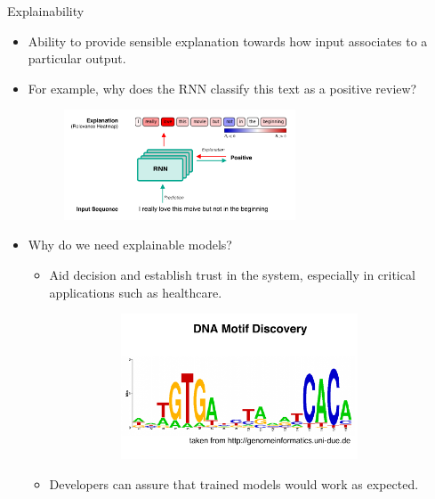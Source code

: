 \documentclass[Nike]{tuberlinbeamer}
\begin{document}
\begin{frame}[allowframebreaks=0.8,t]{Explainability}
\begin{itemize}
	\item Ability to provide sensible explanation towards how input associates to a particular output.
	\item For example, why does the RNN classify this text as a positive review?

	\begin{figure}[h]
		\includegraphics [width=0.65\textwidth]{figures/present_explanation_rnn}
	\end{figure}
	
	\item Why do we need explainable models?\begin{itemize}
		\item Aid decision and establish trust in the system, especially in critical applications such as healthcare.
	\begin{figure}[h]
		\centering
%
		\begin{subfigure}[b]{0.5\linewidth}
		  \centering

			\includegraphics [width=0.9\textwidth]{figures/present_motif_discovery}
		\end{subfigure}
	\end{figure}
		\item Developers can assure that trained models would work as expected.
		\end{itemize}
\end{itemize}
	
\end{frame}
\end{document}
